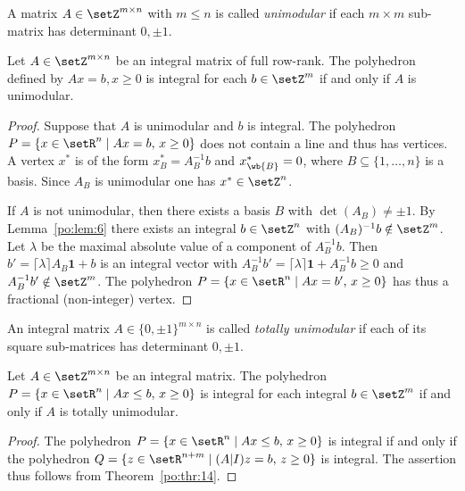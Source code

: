A matrix $A \in \setZ^{m\times n}$ with $m\leq n$ is called \emph{unimodular} if
each $m\times m$ sub-matrix has determinant $0,\pm1$. 

\begin{theorem}
  \label{po:thr:14}
  Let $A \in \setZ^{m\times n}$ be an integral matrix of full row-rank. The
  polyhedron defined by $Ax=b, x\geq0$ is integral for each $b \in \setZ^m$
  if and only if $A$ is unimodular. 
\end{theorem}


\begin{proof}
  Suppose that $A$ is unimodular and $b$ is integral. The polyhedron
  $P = \{ x \in \setR^n \mid Ax=b, \, x\geq0\}$ does not contain a line and
  thus has vertices. A vertex $x^*$ is of the form  $x^*_B= A_B^{-1}b$
  and $x^*_{\wb{B}}=0$, where $B\subseteq\{1,\ldots,n\}$ is a basis. Since $A_B$
  is unimodular one has $x^* \in \setZ^n$. 

  If $A$ is not unimodular, then there exists a basis $B$ with
  $\det(A_B) \neq \pm1$. By Lemma~\ref{po:lem:6} there exists an integral $b
  \in \setZ^n$ with $(A_B)^{-1}b \notin \setZ^m$. Let $\lambda$ be the maximal
  absolute value of a component of $A_B^{-1}b$. Then $b' =  \lceil\lambda\rceil A_B \mathbf{1}
  +b$ is an integral vector with $ A_B^{-1}b' = \lceil\lambda\rceil \mathbf{1}+
  A_B^{-1}b \geq0$ and $A_B^{-1}b' \notin \setZ^m$.  The
  polyhedron $P = \{ x \in \setR^n \mid Ax = b', \, x\geq0\}$ has thus a fractional
  (non-integer) vertex.   
\end{proof}




An integral matrix $A \in \{0 , \pm 1\}^{m\times n}$ is called \emph{totally
  unimodular} if each of its square sub-matrices has determinant
$0,\pm1$. 

\begin{theorem}
  \label{po:thr:16}
  Let $A\in \setZ^{m\times n}$ be an integral matrix. The polyhedron $P = \{ x
  \in \setR^n \mid Ax\leq b, \, x\geq0\}$ is integral for each integral $b \in
  \setZ^m$ if and only if $A$ is totally unimodular. 
\end{theorem}


\begin{proof}
  The polyhedron $P = \{ x  \in \setR^n \mid Ax\leq b, \, x\geq0\}$ is integral
  if and only if the polyhedron $Q = \{ z \in \setR^{n+m} \mid (A|I)z = b,
  \, z\geq0\}$ is integral. The assertion thus follows from
  Theorem~\ref{po:thr:14}. 
\end{proof}


